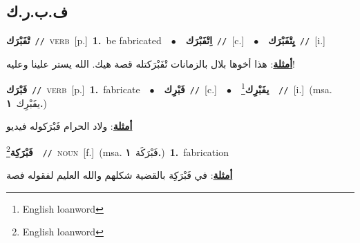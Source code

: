 \documentclass[10pt,a4paper,twoside]{article} %
\begin{document}
\begin{multicols}{2}
\vspace{-3mm}
\subsection*{\color{blue}\foreignlanguage{arabic}{ف.ب.ر.ك}\color{blue}{ (ntws)}} 

{\setlength\topsep{0pt}\textbf{\foreignlanguage{arabic}{تْفَبْرَك}}\ {\color{gray}\texttt{//}\color{black}}\ \textsc{verb}\ [p.]\ \textbf{1.}~be fabricated\ \ $\bullet$\ \ \setlength\topsep{0pt}\textbf{\foreignlanguage{arabic}{اِتْفَبْرَك}}\ {\color{gray}\texttt{//}\color{black}}\ [c.]\ \ $\bullet$\ \ \setlength\topsep{0pt}\textbf{\foreignlanguage{arabic}{يِتْفَبْرَك}}\ {\color{gray}\texttt{//}\color{black}}\ [i.]\  \begin{flushright}\color{gray}\foreignlanguage{arabic}{\textbf{\underline{\foreignlanguage{arabic}{أمثلة}}}: هذا أخوها بلال بالزمانات تْفَبْرَكتله قصة هيك. الله يستر علينا وعليه!}\end{flushright}\color{black}} \vspace{2mm}

{\setlength\topsep{0pt}\textbf{\foreignlanguage{arabic}{فَبْرَك}}\ {\color{gray}\texttt{//}\color{black}}\ \textsc{verb}\ [p.]\ \textbf{1.}~fabricate\ \ $\bullet$\ \ \setlength\topsep{0pt}\textbf{\foreignlanguage{arabic}{فَبْرِك}}\ {\color{gray}\texttt{//}\color{black}}\ [c.]\ \ $\bullet$\ \ \setlength\topsep{0pt}\textbf{\foreignlanguage{arabic}{يفَبْرِك}}\footnote{English loanword}\ \ {\color{gray}\texttt{//}\color{black}}\ [i.]\ \color{gray}(msa. \foreignlanguage{arabic}{يفَبْرِك}~\foreignlanguage{arabic}{\textbf{١.}})\color{black}\  \begin{flushright}\color{gray}\foreignlanguage{arabic}{\textbf{\underline{\foreignlanguage{arabic}{أمثلة}}}: ولاد الحرام فَبْرَكوله فيديو}\end{flushright}\color{black}} \vspace{2mm}

{\setlength\topsep{0pt}\textbf{\foreignlanguage{arabic}{فَبْرَكِة}}\footnote{English loanword}\ \ {\color{gray}\texttt{//}\color{black}}\ \textsc{noun}\ [f.]\ \color{gray}(msa. \foreignlanguage{arabic}{فَبْرَكَة}~\foreignlanguage{arabic}{\textbf{١.}})\color{black}\ \textbf{1.}~fabrication\  \begin{flushright}\color{gray}\foreignlanguage{arabic}{\textbf{\underline{\foreignlanguage{arabic}{أمثلة}}}: في فَبْرَكِة بالقضية شكلهم والله العليم لفقوله فصة}\end{flushright}\color{black}} \vspace{2mm}


\end{multicols}
\end{document}
